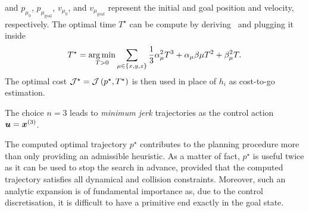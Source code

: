 and $p_{\mu_0}$, $p_{\mu_{\text{goal}}}$, $v_{\mu_0}$, and $v_{\mu_{\text{goal}}}$ represent the initial and goal position and velocity, respectively.
The optimal time $T^{\star}$ can be compute by deriving~ and plugging it inside~
\begin{equation*}
	T^{\star} = \operatorname*{arg\,min}_{T > 0} \sum_{\mu \in \{ x,y,z \}} \frac{1}{3} \alpha_{\mu}^2T^3 + \alpha_{\mu}\beta{\mu}T^2 + \beta_{\mu}^2T.
\end{equation*}
The optimal cost $\mathcal{J}^{\star} = \mathcal{J} \left( p^{\star}, T^{\star}\right)$ is then used in place of $h_i$ as cost-to-go estimation.
\begin{remark}
	The choice $n = 3$ leads to \emph{minimum jerk} trajectories as the control action $\boldsymbol{u} = \boldsymbol{x}^{\left( 3 \right)}$. 
\end{remark}
\begin{remark}
	The computed optimal trajectory $p^{\star}$ contributes to the planning procedure more than only providing an admissible heuristic.
	As a matter of fact, $p^{\star}$ is useful twice as it can be used to stop the search in advance, provided that the computed trajectory
	satisfies all dynamical and collision constraints. Moreover, such an analytic expansion is of fundamental importance as, due to the
	control discretisation, it is difficult to have a primitive end exactly in the goal state.
\end{remark}

